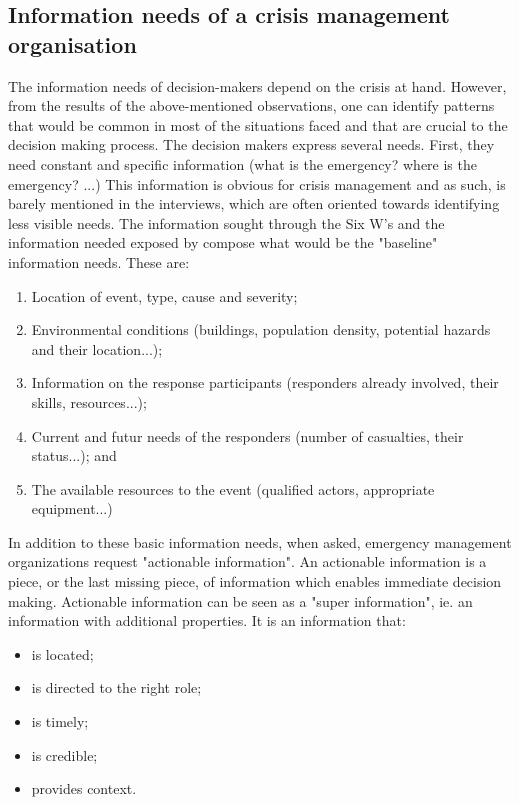 \subsection{Information needs of a crisis management organisation}
The information needs of decision-makers depend on the crisis at hand.
However, from the results of the above-mentioned observations, one can identify patterns
that would be common in most of the situations faced and that are crucial to the decision making process.
The decision makers express several needs.
First, they need constant and specific information (what is the emergency? where is the emergency? ...)
This information is obvious for crisis management and as such, is barely mentioned in the
interviews, which are often oriented towards identifying less visible needs.
The information sought through the Six W's and the information needed exposed by \textcite{jacksonInformationSharingEmergency2006}
compose what would be the "baseline" information needs.
These are:

\begin{enumerate}
    \item Location of event, type, cause and severity;
    \item Environmental conditions (buildings, population density, potential hazards and their location...);
    \item Information on the response participants (responders already involved, their skills, resources...);
    \item Current and futur needs of the responders (number of casualties, their status...); and
    \item The available resources to the event (qualified actors, appropriate equipment...)
\end{enumerate}

In addition to these basic information needs, when asked, emergency management organizations
request "actionable information".
An actionable information is a piece, or the last missing piece, of information which enables
immediate decision making.
Actionable information can be seen as a "super information", ie. an information with additional properties.
It is an information that:

\begin{itemize}
    \item is located;
    \item is directed to the right role;
    \item is timely;
    \item is credible;
    \item provides context.
\end{itemize}

